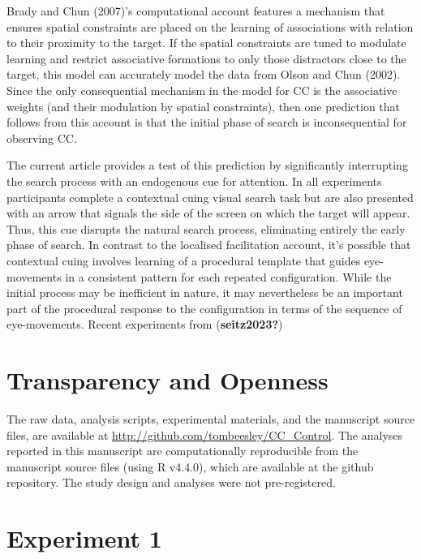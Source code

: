 \documentclass[
  man,
  floatsintext,
  longtable,
  nolmodern,
  notxfonts,
  notimes,
  colorlinks=true,linkcolor=blue,citecolor=blue,urlcolor=blue]{apa7}
\begin{document}
Brady and Chun (2007)'s computational account features a mechanism that
ensures spatial constraints are placed on the learning of associations
with relation to their proximity to the target. If the spatial
constraints are tuned to modulate learning and restrict associative
formations to only those distractors close to the target, this model can
accurately model the data from Olson and Chun (2002). Since the only
consequential mechanism in the model for CC is the associative weights
(and their modulation by spatial constraints), then one prediction that
follows from this account is that the initial phase of search is
inconsequential for observing CC.

The current article provides a test of this prediction by significantly
interrupting the search process with an endogenous cue for attention. In
all experiments participants complete a contextual cuing visual search
task but are also presented with an arrow that signals the side of the
screen on which the target will appear. Thus, this cue disrupts the
natural search process, eliminating entirely the early phase of search.
In contrast to the localised facilitation account, it's possible that
contextual cuing involves learning of a procedural template that guides
eye-movements in a consistent pattern for each repeated configuration.
While the initial process may be inefficient in nature, it may
nevertheless be an important part of the procedural response to the
configuration in terms of the sequence of eye-movements. Recent
experiments from (\textbf{seitz2023?})

\section{Transparency and Openness}\label{transparency-and-openness}

The raw data, analysis scripts, experimental materials, and the
manuscript source files, are available at
\url{http://github.com/tombeesley/CC_Control}. The analyses reported in
this manuscript are computationally reproducible from the manuscript
source files (using R v4.4.0), which are available at the github
repository. The study design and analyses were not pre-registered.

\section{Experiment 1}\label{experiment-1}
\end{document}
